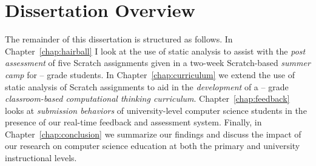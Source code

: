\section{Dissertation Overview}
The remainder of this dissertation is structured as follows. In
Chapter~\ref{chap:hairball} I look at the use of static analysis to assist with
the \emph{post assessment} of five Scratch assignments given in a two-week
Scratch-based \emph{summer camp} for -- grade students. In
Chapter~\ref{chap:curriculum} we extend the use of static analysis of Scratch
assignments to aid in the \emph{development} of a -- grade
\emph{classroom-based computational thinking
  curriculum}. Chapter~\ref{chap:feedback} looks at \emph{submission behaviors}
of university-level computer science students in the presence of our real-time
feedback and assessment system. Finally, in Chapter~\ref{chap:conclusion} we
summarize our findings and discuss the impact of our research on computer
science education at both the primary and university instructional levels.
